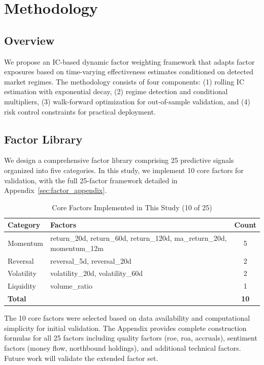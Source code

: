 \section{Methodology}
\label{sec:methodology}

\subsection{Overview}

We propose an IC-based dynamic factor weighting framework that adapts factor exposures based on time-varying effectiveness estimates conditioned on detected market regimes. The methodology consists of four components: (1) rolling IC estimation with exponential decay, (2) regime detection and conditional multipliers, (3) walk-forward optimization for out-of-sample validation, and (4) risk control constraints for practical deployment.

\subsection{Factor Library}

We design a comprehensive factor library comprising 25 predictive signals organized into five categories. In this study, we implement 10 core factors for validation, with the full 25-factor framework detailed in Appendix~\ref{sec:factor_appendix}.

\begin{table}[h]
\centering
\caption{Core Factors Implemented in This Study (10 of 25)}
\label{tab:factors}
\begin{tabular}{llc}
\toprule
Category & Factors & Count \\
\midrule
Momentum & return\_20d, return\_60d, return\_120d, ma\_return\_20d, momentum\_12m & 5 \\
Reversal & reversal\_5d, reversal\_20d & 2 \\
Volatility & volatility\_20d, volatility\_60d & 2 \\
Liquidity & volume\_ratio & 1 \\
\midrule
\textbf{Total} & & \textbf{10} \\
\bottomrule
\end{tabular}
\end{table}

The 10 core factors were selected based on data availability and computational simplicity for initial validation. The Appendix provides complete construction formulas for all 25 factors including quality factors (roe, roa, accruals), sentiment factors (money flow, northbound holdings), and additional technical factors. Future work will validate the extended factor set.


